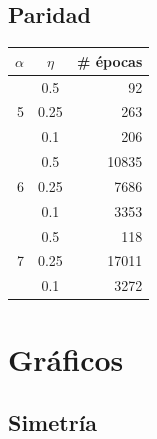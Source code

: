 \documentclass{article}
\begin{document}
\subsection{Paridad}

\begin{table}[h]
\begin{center}
\begin{tabular}{|r|c|r|}
 \hline
\textbf{$\alpha$} &  \textbf{$\eta$} & \textbf{\# épocas} \\
 \hline
 \multirow{3}{*}{5}
 & 0.5 & 92 \\
 \cline{2-3}
 & 0.25 & 263 \\
 \cline{2-3}
& 0.1 & 206 \\
 \hline
 \multirow{3}{*}{6}
 & 0.5 & 10835 \\
 \cline{2-3}
 & 0.25 & 7686 \\
 \cline{2-3}
  & 0.1 & 3353 \\
 \hline
 \multirow{3}{*}{7}
  &  0.5 & 118 \\
 \cline{2-3}
  & 0.25 & 17011 \\
 \cline{2-3}
  & 0.1 & 3272 \\
 \hline
\end{tabular}
\end{center}
\label{parityTable}
\end{table}

\clearpage

\section{Gráficos}
\subsection{Simetría}
\end{document}
